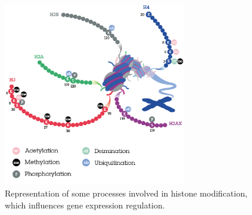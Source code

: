 \begin{figure}[h]
\centering
\includegraphics[width=8cm, keepaspectratio]{img/intro/hm.png}
\caption[Histon modification]{Representation of some processes involved in histone modification, which influences gene expression regulation.}
\label{fig:histmod}
\end{figure}

